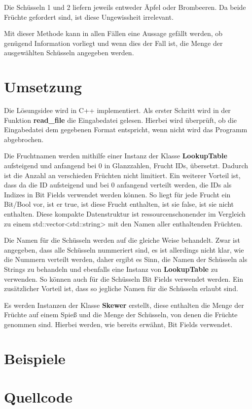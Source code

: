 \documentclass[a4paper,10pt,ngerman]{scrartcl}
\begin{document}
Die Schüsseln 1 und 2 liefern jeweils entweder Äpfel oder Brombeeren.
Da beide Früchte gefordert sind, ist diese Ungewissheit irrelevant.

Mit dieser Methode kann in allen Fällen eine Aussage gefällt werden, ob genügend Information vorliegt und wenn dies der Fall ist, die Menge der ausgewählten Schüsseln angegeben werden.

\section{Umsetzung}
Die Lösungsidee wird in C++ implementiert.
Als erster Schritt wird in der Funktion \textbf{read\_file} die Eingabedatei gelesen.
Hierbei wird überprüft, ob die Eingabedatei dem gegebenen Format entspricht, wenn nicht wird das Programm abgebrochen.

Die Fruchtnamen werden mithilfe einer Instanz der Klasse \textbf{LookupTable} aufsteigend und anfangend bei $0$ in Glanzzahlen, Frucht IDs, übersetzt.
Dadurch ist die Anzahl an verschieden Früchten nicht limitiert.
Ein weiterer Vorteil ist, dass da die ID aufsteigend und bei $0$ anfangend verteilt werden, die IDs als Indizes in Bit Fields verwendet werden können.
So liegt für jede Frucht ein Bit/Bool vor, ist er true, ist diese Frucht enthalten, ist sie false, ist sie nicht enthalten.
Diese kompakte Datenstruktur ist ressourcenschonender im Vergleich zu einem std::vector<std::string> mit den Namen aller enthaltenden Früchten.

Die Namen für die Schüsseln werden auf die gleiche Weise behandelt.
Zwar ist angegeben, dass alle Schüsseln nummeriert sind, es ist allerdings nicht klar, wie die Nummern verteilt werden, daher ergibt es Sinn, die Namen der Schüsseln als Strings zu behandeln und ebenfalls eine Instanz von \textbf{LookupTable} zu verwenden.
So können auch für die Schüsseln Bit Fields verwendet werden.
Ein zusätzlicher Vorteil ist, dass so jegliche Namen für die Schüsseln erlaubt sind.

Es werden Instanzen der Klasse \textbf{Skewer} erstellt, diese enthalten die Menge der Früchte auf einem Spieß und die Menge der Schüsseln, von denen die Früchte genommen sind.
Hierbei werden, wie bereits erwähnt, Bit Fields verwendet.



\section{Beispiele}

\section{Quellcode}
\end{document}
